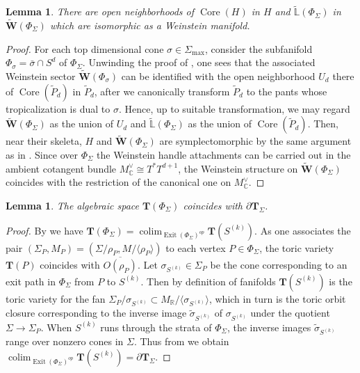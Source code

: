 \documentclass[a4paper,12pt, twoside, pdftex]{amsart}
\newtheorem{lemma}[dummy]{Lemma}
\theoremstyle{definition}
\numberwithin{equation}{section}
\newcommand{\pref}{\prettyref}
\newcommand{\colim}{\operatorname{colim}}
\newcommand{\Core}{\operatorname{Core}}
\newcommand{\del}{\partial}
\newcommand{\Exit}{\operatorname{Exit}}
\newcommand{\bC}{\mathbb{C}}
\newcommand{\bL}{\mathbb{L}}
\newcommand{\bR}{\mathbb{R}}
\newcommand{\bfT}{\mathbf{T}}
\newcommand{\bfW}{\mathbf{W}}
\begin{document}
\begin{lemma} \label{lem:A-matching}
There are open neighborhoods of
$\Core(H)$
in
$H$
and
$\widetilde{\bL}(\Phi_\Sigma)$
in
$\widetilde{\bfW}(\Phi_\Sigma)$
which are isomorphic as a Weinstein manifold.
\end{lemma}
\begin{proof}
For each top dimensional cone
$\sigma \in \Sigma_{\max}$,
consider the subfanifold
$\Phi_\sigma = \bar{\sigma} \cap S^d$
of
$\Phi_\Sigma$.
Unwinding the proof of
\cite[Theorem 5.13]{Nad},
one sees that
the associated Weinstein sector
$\widetilde{\bfW}(\Phi_\sigma)$
can be identified with the open neighborhood
$U_d$
there of
$\Core(\tilde{P}_d)$
in
$\tilde{P}_d$,
after we canonically transform
$\tilde{P}_d$
to the pants 
whose tropicalization is dual to
$\sigma$.
Hence,
up to suitable transformation,
we may regard
$\widetilde{\bfW}(\Phi_\Sigma)$
as the union of
$U_d$
and
$\widetilde{\bL}(\Phi_\Sigma)$
as the union of
$\Core(\tilde{P}_d)$.
Then,
near their skeleta,
$H$
and
$\widetilde{\bfW}(\Phi_\Sigma)$
are symplectomorphic by the same argument as in
\cite[Theorem 5.13]{Nad}.
Since over
$\Phi_\Sigma$
the Weinstein handle attachments can be carried out in the ambient cotangent bundle
$M^\vee_\bC \cong T^* T^{d+1}$,
the Weinstein structure on
$\widetilde{\bfW}(\Phi_\Sigma)$
coincides with the restriction of the canonical one on
$M^\vee_\bC$.
\end{proof}

\begin{lemma} \label{lem:B-matching}
The algebraic space
$\bfT(\Phi_\Sigma)$
coincides with
$\del \bfT_\Sigma$.
\end{lemma}
\begin{proof}
By
\cite[Proposition 3.13]{GS1}
we have
$\bfT(\Phi_\Sigma)
=
\colim_{\Exit(\Phi_\Sigma)^{op}} \bfT(S^{(k)})$.
As one associates the pair
$(\Sigma_P, M_P)
=
(\Sigma / \rho_P, M / \langle \rho_P \rangle)$
to each vertex
$P \in \Phi_\Sigma$,
the toric variety
$\bfT(P)$
coincides with
$\overline{O(\rho_P)}$.
Let
$\sigma_{S^{(k)}} \in \Sigma_P$
be the cone corresponding to an exit path in
$\Phi_\Sigma$
from
$P$
to
$S^{(k)}$.
Then by definition of fanifolds
$\bfT(S^{(k)})$
is the toric variety for the fan
$\Sigma_P / \sigma_{S^{(k)}}
\subset
M_\bR / \langle \sigma_{S^{(k)}} \rangle$,
which in turn is the toric orbit closure corresponding to the inverse image
$\tilde{\sigma}_{S^{(k)}}$
of
$\sigma_{S^{(k)}}$
under the quotient
$\Sigma \to \Sigma_P$. 
When
$S^{(k)}$
runs through the strata of
$\Phi_\Sigma$,
the inverse images
$\tilde{\sigma}_{S^{(k)}}$
range over nonzero cones in
$\Sigma$.
Thus from
\pref{eq:5.3}
we obtain
$\colim_{\Exit(\Phi_\Sigma)^{op}} \bfT(S^{(k)})
=
\del \bfT_\Sigma$.
\end{proof}
\end{document}
